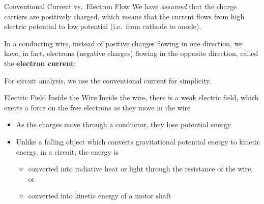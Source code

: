 \documentclass[12pt,aspectratio=169]{beamer}
\begin{document}
\begin{frame}{Conventional Current vs.\ Electron Flow}
  We have \emph{assumed} that the charge carriers are positively charged, which
  means that the current flows from high electric potential to low potential
  (i.e.\ from cathode to anode).
  \begin{center}
  \end{center}
  In a conducting wire, instead of positive charges flowing in one direction,
  we have, in fact, electrons (negative charges) flowing in the opposite
  direction, called the \textbf{electron current}:
  \begin{center}
  \end{center}
  For circuit analysis, we use the conventional current for simplicity.
\end{frame}



\begin{frame}{Electric Field Inside the Wire}
  Inside the wire, there is a weak electric field, which exerts a force on the
  free electrons as they move in the wire
  \begin{itemize}
  \item As the charges move through a conductor, they lose potential energy
  \item Unlike a falling object which converts gravitational potential energy
    to kinetic energy, in a circuit, the energy is 
    \begin{itemize}
    \item converted into radiative heat or light through the resistance of the
      wire, or
    \item converted into kinetic energy of a motor shaft
    \end{itemize}
  \end{itemize}
\end{frame}
\end{document}
